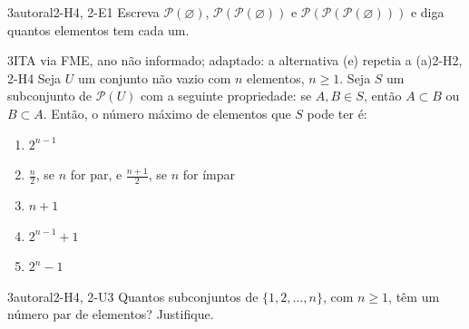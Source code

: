 \begin{questao}{3}{autoral}{2-H4, 2-E1}\label{u2:vazios3}
Escreva $\mathcal{P}(\varnothing)$, $\mathcal{P}(\mathcal{P}(\varnothing))$ e $\mathcal{P}(\mathcal{P}(\mathcal{P}(\varnothing)))$ e diga quantos elementos tem cada um.
\end{questao}

\begin{questao}{3}{ITA via FME, ano não informado; adaptado: a alternativa (e) repetia a (a)}{2-H2, 2-H4}\label{u2:cadeias}
Seja $U$ um conjunto não vazio com $n$ elementos, $n\ge1$. Seja $S$ um subconjunto de $\mathcal{P}(U)$ com a seguinte propriedade: se $A,B\in S$, então $A\subset B$ ou $B\subset A$. Então, o número máximo de elementos que $S$ pode ter é:
\begin{enumerate}[label=\alph*)]
  \item $2^{n-1}$
  \item $\frac{n}{2}$, se $n$ for par, e $\frac{n+1}{2}$, se $n$ for ímpar
  \item $n+1$
  \item $2^{n-1}+1$
  \item $2^{n}-1$
\end{enumerate}
\end{questao}

\begin{questao}{3}{autoral}{2-H4, 2-U3}\label{u2:paridade}
Quantos subconjuntos de $\{1,2,\ldots,n\}$, com $n\ge1$, têm um número par de elementos? Justifique.
\end{questao}

